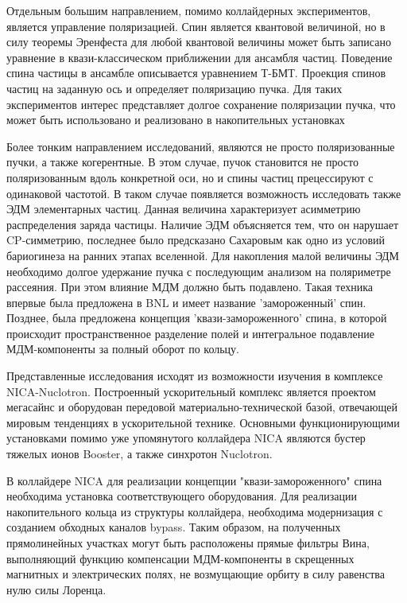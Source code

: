 \par Отдельным большим направлением, помимо коллайдерных экспериментов, является управление поляризацией. Спин является квантовой величиной, но в силу теоремы Эренфеста для любой квантовой величины может быть записано уравнение в квази-классическом приближении для ансамбля частиц. Поведение спина частицы в ансамбле описывается уравнением Т-БМТ. Проекция спинов частиц на заданную ось и определяет поляризацию пучка. Для таких экспериментов интерес представляет долгое сохранение поляризации пучка, что может быть использовано и реализовано в накопительных установках 

\par Более тонким направлением исследований, являются не просто поляризованные пучки, а также когерентные. В этом случае, пучок становится не просто поляризованным вдоль конкретной оси, но и спины частиц прецессируют с одинаковой частотой. В таком случае появляется возможность исследовать также ЭДМ элементарных частиц. Данная величина характеризует асимметрию распределения заряда частицы. Наличие ЭДМ объясняется тем, что он нарушает CP-симметрию, последнее было предсказано Сахаровым как одно из условий бариогинеза на ранних этапах вселенной. Для накопления малой величины ЭДМ необходимо долгое удержание пучка с последующим анализом на поляриметре рассеяния. При этом влияние МДМ должно быть подавлено. Такая техника впервые была предложена в BNL и имеет название 'замороженный' спин. Позднее, была предложена концепция 'квази-замороженного' спина, в которой происходит пространственное разделение полей и интегральное подавление МДМ-компоненты за полный оборот по кольцу.

\par Представленные исследования исходят из возможности изучения в комплексе NICA-Nuclotron. Построенный ускорительный комплекс является проектом мегасайнс и оборудован передовой материально-технической базой, отвечающей мировым тенденциях в ускорительной технике. Основными функционирующими установками помимо уже упомянутого коллайдера NICA являются бустер тяжелых ионов Booster, а также синхротон Nuclotron.

\par В коллайдере NICA для реализации концепции "квази-замороженного" спина необходима установка соответствующего оборудования. Для реализации накопительного кольца из структуры коллайдера, необходима модернизация с созданием обходных каналов bypass. Таким образом, на полученных прямолинейных участках могут быть расположены прямые фильтры Вина, выполняющий функцию компенсации МДМ-компоненты в скрещенных магнитных и электрических полях, не возмущающие орбиту в силу равенства нулю силы Лоренца.

